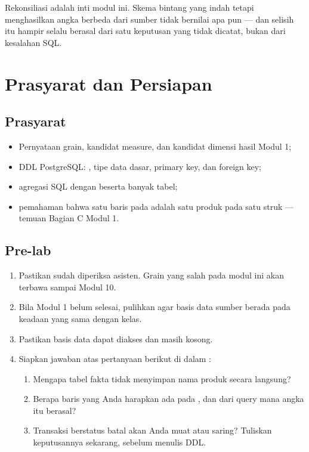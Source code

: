 Rekonsiliasi adalah inti modul ini. Skema bintang yang indah tetapi
menghasilkan angka berbeda dari sumber tidak bernilai apa pun --- dan selisih
itu hampir selalu berasal dari satu keputusan yang tidak dicatat, bukan dari
kesalahan SQL.

\section{Prasyarat dan Persiapan}

\subsection{Prasyarat}

\begin{itemize}
  \item Pernyataan grain, kandidat measure, dan kandidat dimensi hasil Modul 1;
  \item DDL PostgreSQL: , tipe data dasar, primary key,
        dan foreign key;
  \item agregasi SQL dengan  beserta  banyak
        tabel;
  \item pemahaman bahwa satu baris pada  adalah satu
        produk pada satu struk --- temuan Bagian C Modul 1.
\end{itemize}

\subsection{Pre-lab}

\begin{enumerate}[leftmargin=1.4em]
  \item Pastikan  sudah diperiksa asisten. Grain
        yang salah pada modul ini akan terbawa sampai Modul 10.
  \item Bila Modul 1 belum selesai, pulihkan 
        agar basis data sumber berada pada keadaan yang sama dengan kelas.
  \item Pastikan basis data  dapat diakses dan masih
        kosong.
  \item Siapkan jawaban atas pertanyaan berikut di dalam
        :
  \begin{enumerate}[label=\alph*.,leftmargin=1.4em]
    \item Mengapa tabel fakta tidak menyimpan nama produk secara langsung?
    \item Berapa baris yang Anda harapkan ada pada ,
          dan dari query mana angka itu berasal?
    \item Transaksi berstatus batal akan Anda muat atau saring? Tuliskan
          keputusannya sekarang, sebelum menulis DDL.
  \end{enumerate}
\end{enumerate}

